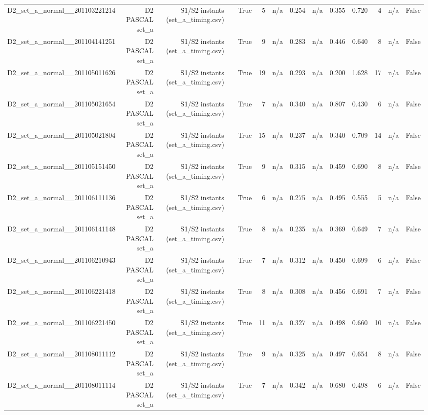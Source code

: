\begin{table}[htbp]
\begin{tabular}{lrrrrrrrrrrrrr}
    D2\_set\_a\_normal\_\_201103221214 & D2 PASCAL set\_a & S1/S2 instants (set\_a\_timing.csv) &  & True & 5 & n/a & 0.254 & n/a & 0.355 & 0.720 & 4 & n/a & False \\
    D2\_set\_a\_normal\_\_201104141251 & D2 PASCAL set\_a & S1/S2 instants (set\_a\_timing.csv) &  & True & 9 & n/a & 0.283 & n/a & 0.446 & 0.640 & 8 & n/a & False \\
    D2\_set\_a\_normal\_\_201105011626 & D2 PASCAL set\_a & S1/S2 instants (set\_a\_timing.csv) &  & True & 19 & n/a & 0.293 & n/a & 0.200 & 1.628 & 17 & n/a & False \\
    D2\_set\_a\_normal\_\_201105021654 & D2 PASCAL set\_a & S1/S2 instants (set\_a\_timing.csv) &  & True & 7 & n/a & 0.340 & n/a & 0.807 & 0.430 & 6 & n/a & False \\
    D2\_set\_a\_normal\_\_201105021804 & D2 PASCAL set\_a & S1/S2 instants (set\_a\_timing.csv) &  & True & 15 & n/a & 0.237 & n/a & 0.340 & 0.709 & 14 & n/a & False \\
    D2\_set\_a\_normal\_\_201105151450 & D2 PASCAL set\_a & S1/S2 instants (set\_a\_timing.csv) &  & True & 9 & n/a & 0.315 & n/a & 0.459 & 0.690 & 8 & n/a & False \\
    D2\_set\_a\_normal\_\_201106111136 & D2 PASCAL set\_a & S1/S2 instants (set\_a\_timing.csv) &  & True & 6 & n/a & 0.275 & n/a & 0.495 & 0.555 & 5 & n/a & False \\
    D2\_set\_a\_normal\_\_201106141148 & D2 PASCAL set\_a & S1/S2 instants (set\_a\_timing.csv) &  & True & 8 & n/a & 0.235 & n/a & 0.369 & 0.649 & 7 & n/a & False \\
    D2\_set\_a\_normal\_\_201106210943 & D2 PASCAL set\_a & S1/S2 instants (set\_a\_timing.csv) &  & True & 7 & n/a & 0.312 & n/a & 0.450 & 0.699 & 6 & n/a & False \\
    D2\_set\_a\_normal\_\_201106221418 & D2 PASCAL set\_a & S1/S2 instants (set\_a\_timing.csv) &  & True & 8 & n/a & 0.308 & n/a & 0.456 & 0.691 & 7 & n/a & False \\
    D2\_set\_a\_normal\_\_201106221450 & D2 PASCAL set\_a & S1/S2 instants (set\_a\_timing.csv) &  & True & 11 & n/a & 0.327 & n/a & 0.498 & 0.660 & 10 & n/a & False \\
    D2\_set\_a\_normal\_\_201108011112 & D2 PASCAL set\_a & S1/S2 instants (set\_a\_timing.csv) &  & True & 9 & n/a & 0.325 & n/a & 0.497 & 0.654 & 8 & n/a & False \\
    D2\_set\_a\_normal\_\_201108011114 & D2 PASCAL set\_a & S1/S2 instants (set\_a\_timing.csv) &  & True & 7 & n/a & 0.342 & n/a & 0.680 & 0.498 & 6 & n/a & False \\

\end{tabular}
\end{table}
